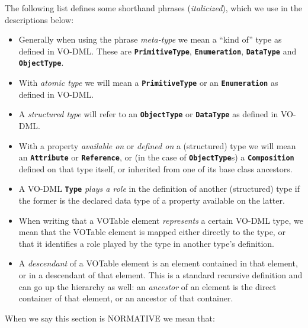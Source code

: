 \documentclass[11pt,a4paper]{ivoa}
\begin{document}
The following list defines some shorthand phrases (\emph{italicized}),
which we use in the descriptions below:

\begin{itemize}
\item
  Generally when using the phrase \emph{meta-type} we mean a ``kind of''
  type as defined in VO-DML. These are \textbf{\texttt{PrimitiveType}},
  \textbf{\texttt{Enumeration}}, \textbf{\texttt{DataType}} and
  \textbf{\texttt{ObjectType}}.
\item
  With \emph{atomic type} we will mean a \textbf{\texttt{PrimitiveType}}
  or an \textbf{\texttt{Enumeration}} as defined in VO-DML.
\item
  A \emph{structured type} will refer to an \textbf{\texttt{ObjectType}}
  or \textbf{\texttt{DataType}} as defined in VO-DML.
\item
  With a property \emph{available on} or \emph{defined on} a
  (structured) type we will mean an \textbf{\texttt{Attribute}} or
  \textbf{\texttt{Reference}}, or (in the case of
  \textbf{\texttt{ObjectType}}s) a \textbf{\texttt{Composition}} defined
  on that type itself, or inherited from one of its base class
  ancestors.
\item
  A VO-DML \textbf{\texttt{Type}} \emph{plays a role} in the definition
  of another (structured) type if the former is the declared data type
  of a property available on the latter.
\item
  When writing that a VOTable element \emph{represents} a certain VO-DML
  type, we mean that the VOTable element is mapped either directly to
  the type, or that it identifies a role played by the type in another
  type's definition.
\item
  A \emph{descendant} of a VOTable element is an element contained in
  that element, or in a descendant of that element. This is a standard
  recursive definition and can go up the hierarchy as well: an
  \emph{ancestor} of an element is the direct container of that element,
  or an ancestor of that container.
\end{itemize}

When we say this section is NORMATIVE we mean that:
\end{document}
